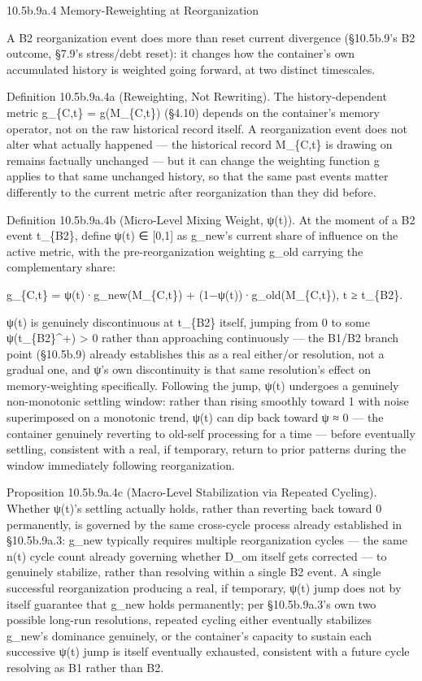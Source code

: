 \documentclass[
]{article}
\begin{document}
10.5b.9a.4 Memory-Reweighting at Reorganization

A B2 reorganization event does more than reset current divergence
(§10.5b.9's B2 outcome, §7.9's stress/debt reset): it changes how the
container's own accumulated history is weighted going forward, at two
distinct timescales.

Definition 10.5b.9a.4a (Reweighting, Not Rewriting). The
history-dependent metric g\_\{C,t\} = g(M\_\{C,t\}) (§4.10) depends on
the container's memory operator, not on the raw historical record
itself. A reorganization event does not alter what actually happened ---
the historical record M\_\{C,t\} is drawing on remains factually
unchanged --- but it can change the weighting function g applies to that
same unchanged history, so that the same past events matter differently
to the current metric after reorganization than they did before.

Definition 10.5b.9a.4b (Micro-Level Mixing Weight, ψ(t)). At the moment
of a B2 event t\_\{B2\}, define ψ(t) ∈ {[}0,1{]} as g\_new's current
share of influence on the active metric, with the pre-reorganization
weighting g\_old carrying the complementary share:

g\_\{C,t\} = ψ(t)·g\_new(M\_\{C,t\}) + (1−ψ(t))·g\_old(M\_\{C,t\}), t ≥
t\_\{B2\}.

ψ(t) is genuinely discontinuous at t\_\{B2\} itself, jumping from 0 to
some ψ(t\_\{B2\}\^{}+) \textgreater{} 0 rather than approaching
continuously --- the B1/B2 branch point (§10.5b.9) already establishes
this as a real either/or resolution, not a gradual one, and ψ's own
discontinuity is that same resolution's effect on memory-weighting
specifically. Following the jump, ψ(t) undergoes a genuinely
non-monotonic settling window: rather than rising smoothly toward 1 with
noise superimposed on a monotonic trend, ψ(t) can dip back toward ψ ≈ 0
--- the container genuinely reverting to old-self processing for a time
--- before eventually settling, consistent with a real, if temporary,
return to prior patterns during the window immediately following
reorganization.

Proposition 10.5b.9a.4c (Macro-Level Stabilization via Repeated
Cycling). Whether ψ(t)'s settling actually holds, rather than reverting
back toward 0 permanently, is governed by the same cross-cycle process
already established in §10.5b.9a.3: g\_new typically requires multiple
reorganization cycles --- the same n(t) cycle count already governing
whether D\_om itself gets corrected --- to genuinely stabilize, rather
than resolving within a single B2 event. A single successful
reorganization producing a real, if temporary, ψ(t) jump does not by
itself guarantee that g\_new holds permanently; per §10.5b.9a.3's own
two possible long-run resolutions, repeated cycling either eventually
stabilizes g\_new's dominance genuinely, or the container's capacity to
sustain each successive ψ(t) jump is itself eventually exhausted,
consistent with a future cycle resolving as B1 rather than B2.
\end{document}
